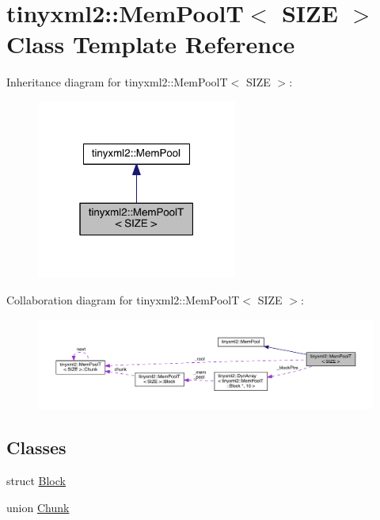 \hypertarget{classtinyxml2_1_1_mem_pool_t}{}\section{tinyxml2\+:\+:Mem\+Pool\+T$<$ S\+I\+Z\+E $>$ Class Template Reference}
\label{classtinyxml2_1_1_mem_pool_t}


Inheritance diagram for tinyxml2\+:\+:Mem\+Pool\+T$<$ S\+I\+Z\+E $>$\+:\nopagebreak
\begin{figure}[H]
\begin{center}
\leavevmode
\includegraphics[width=187pt]{classtinyxml2_1_1_mem_pool_t__inherit__graph}
\end{center}
\end{figure}


Collaboration diagram for tinyxml2\+:\+:Mem\+Pool\+T$<$ S\+I\+Z\+E $>$\+:\nopagebreak
\begin{figure}[H]
\begin{center}
\leavevmode
\includegraphics[width=350pt]{classtinyxml2_1_1_mem_pool_t__coll__graph}
\end{center}
\end{figure}
\subsection*{Classes}
\begin{DoxyCompactItemize}
\item 
struct \hyperlink{structtinyxml2_1_1_mem_pool_t_1_1_block}{Block}
\item 
union \hyperlink{uniontinyxml2_1_1_mem_pool_t_1_1_chunk}{Chunk}
\end{DoxyCompactItemize}
